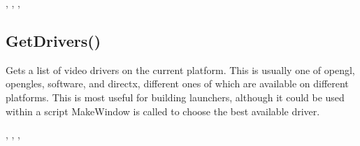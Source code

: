 \documentclass[letterpaper,10pt,english]{sphinxmanual}
\begin{document}
\sphinxAtStartPar
{}

\begin{sphinxVerbatim}[commandchars=\\\{\}]
\end{sphinxVerbatim}

\sphinxAtStartPar
{}

\sphinxAtStartPar
{}, ,       ,            

\ignorespaces 

\subsection{GetDrivers()}
\label{\detokenize{reference/peblenvironment:getdrivers}}\label{\detokenize{reference/peblenvironment:index-9}}
\sphinxAtStartPar
{}

\sphinxAtStartPar
{}

\sphinxAtStartPar
Gets a list of video drivers on the current platform. This is usually one of opengl, opengles, software, and directx, different ones of which are available on different platforms.  This is most useful for building launchers, although it could be used within a script  MakeWindow is called to choose the best available driver.

\sphinxAtStartPar
{}

\begin{sphinxVerbatim}[commandchars=\\\{\}]
\end{sphinxVerbatim}

\sphinxAtStartPar
{}

\sphinxAtStartPar
{}, , ,          
\end{document}
